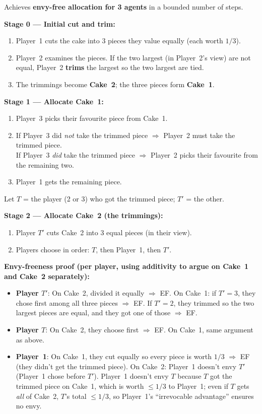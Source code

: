 \begin{thmbox}
Achieves \textbf{envy-free allocation for 3 agents} in a bounded number of steps.

\textbf{Stage 0 --- Initial cut and trim:}
\begin{enumerate}
  \item Player~1 cuts the cake into 3 pieces they value equally (each worth $1/3$).
  \item Player~2 examines the pieces. If the two largest (in Player~2's view) are not equal, Player~2 \textbf{trims} the largest so the two largest are tied.
  \item The trimmings become \textbf{Cake~2}; the three pieces form \textbf{Cake~1}.
\end{enumerate}

\textbf{Stage 1 --- Allocate Cake~1:}
\begin{enumerate}
  \item Player~3 picks their favourite piece from Cake~1.
  \item If Player~3 did \emph{not} take the trimmed piece $\Rightarrow$ Player~2 must take the trimmed piece.\\
        If Player~3 \emph{did} take the trimmed piece $\Rightarrow$ Player~2 picks their favourite from the remaining two.
  \item Player~1 gets the remaining piece.
\end{enumerate}
Let $T$ = the player (2 or 3) who got the trimmed piece; $T'$ = the other.

\textbf{Stage 2 --- Allocate Cake~2 (the trimmings):}
\begin{enumerate}
  \item Player $T'$ cuts Cake~2 into 3 equal pieces (in their view).
  \item Players choose in order: $T$, then Player~1, then $T'$.
\end{enumerate}
\end{thmbox}

\textbf{Envy-freeness proof (per player, using additivity to argue on Cake~1 and Cake~2 separately):}

\begin{itemize}
  \item \textbf{Player $T'$}: On Cake~2, divided it equally $\Rightarrow$ EF. On Cake~1: if $T' = 3$, they chose first among all three pieces $\Rightarrow$ EF. If $T' = 2$, they trimmed so the two largest pieces are equal, and they got one of those $\Rightarrow$ EF.

  \item \textbf{Player $T$}: On Cake~2, they choose first $\Rightarrow$ EF. On Cake~1, same argument as above.

  \item \textbf{Player~1}: On Cake~1, they cut equally so every piece is worth $1/3$ $\Rightarrow$ EF (they didn't get the trimmed piece). On Cake~2: Player~1 doesn't envy $T'$ (Player~1 chose before $T'$). Player~1 doesn't envy $T$ because $T$ got the trimmed piece on Cake~1, which is worth $\le 1/3$ to Player~1; even if $T$ gets \emph{all} of Cake~2, $T$'s total $\le 1/3$, so Player~1's ``irrevocable advantage'' ensures no envy.
\end{itemize}

